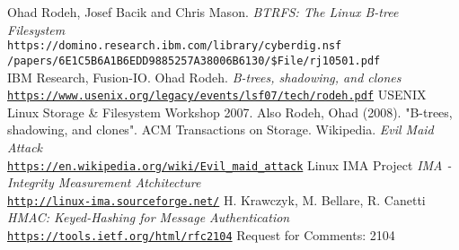 \documentclass[10pt]{article}
\begin{document}
\begin{thebibliography}{9}
	Ohad Rodeh, Josef Bacik and Chris Mason.
	\textit{BTRFS: The Linux B-tree Filesystem}
	\\\texttt{https://domino.research.ibm.com/library/cyberdig.nsf\\/papers/6E1C5B6A1B6EDD9885257A38006B6130/\$File/rj10501.pdf}
	\\IBM Research, Fusion-IO.
	Ohad Rodeh.
	\textit{B-trees, shadowing, and clones}
	\\\texttt{\href{https://www.usenix.org/legacy/events/lsf07/tech/rodeh.pdf}{https://www.usenix.org/legacy/events/lsf07/tech/rodeh.pdf}}
	USENIX Linux Storage \& Filesystem Workshop 2007. Also Rodeh, Ohad (2008). "B-trees, shadowing, and clones". ACM Transactions on Storage.
	Wikipedia.
	\textit{Evil Maid Attack}
	\\\texttt{\href{https://en.wikipedia.org/wiki/Evil\_maid\_attack}{https://en.wikipedia.org/wiki/Evil\_maid\_attack}}
	Linux IMA Project
	\textit{IMA - Integrity Measurement Atchitecture}
	\\\texttt{\href{http://linux-ima.sourceforge.net/}{http://linux-ima.sourceforge.net/}}
	H. Krawczyk, M. Bellare, R. Canetti
	\textit{HMAC: Keyed-Hashing for Message Authentication}
	\\\texttt{\href{https://tools.ietf.org/html/rfc2104}{https://tools.ietf.org/html/rfc2104}}
	Request for Comments: 2104 	
\end{thebibliography}
\end{document}
